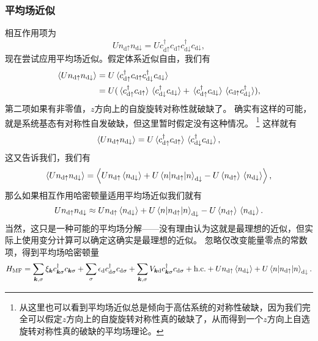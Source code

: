 \documentclass[hyperref, UTF8, a4paper]{ctexart}
\begin{document}
\subsubsection{平均场近似}

相互作用项为
\[
    U {n}_{\text{d} \uparrow} {n}_{\text{d} \downarrow} = U {c}_{\text{d} \uparrow}^\dagger {c}_{\text{d} \uparrow} {c}^\dagger_{\text{d} \downarrow} {c}_{\text{d} \downarrow},
\]
现在尝试应用平均场近似。假定体系近似自由，我们有
\[
    \begin{aligned}
        \expval{U {n}_{\text{d} \uparrow} {n}_{\text{d} \downarrow}} &= U \expval*{{c}_{\text{d} \uparrow}^\dagger {c}_{\text{d} \uparrow} {c}^\dagger_{\text{d} \downarrow} {c}_{\text{d} \downarrow}} \\
        &= U ( \expval*{{c}_{\text{d} \uparrow}^\dagger {c}_{\text{d} \uparrow}} \expval*{{c}_{\text{d} \downarrow}^\dagger {c}_{\text{d} \downarrow}} + \expval*{{c}_{\text{d} \uparrow}^\dagger {c}_{\text{d} \downarrow}} \expval*{{c}_{\text{d} \uparrow} {c}^\dagger_{\text{d} \downarrow}} ),
    \end{aligned}
\]
第二项如果有非零值，$z$方向上的自旋旋转对称性就破缺了。
确实有这样的可能，就是系统基态有对称性自发破缺，但这里暂时假定没有这种情况。%
\footnote{从这里也可以看到平均场近似总是倾向于高估系统的对称性破缺，因为我们完全可以假定$z$方向上的自旋旋转对称性真的破缺了，从而得到一个$z$方向上自选旋转对称性真的破缺的平均场理论。
}%
这样就有
\[
    \expval{U {n}_{\text{d} \uparrow} {n}_{\text{d} \downarrow}} = U \expval*{{c}_{\text{d} \uparrow}^\dagger {c}_{\text{d} \uparrow}} \expval*{{c}_{\text{d} \downarrow}^\dagger {c}_{\text{d} \downarrow}},
\]
这又告诉我们，我们有
\[
    \expval{U {n}_{\text{d} \uparrow} {n}_{\text{d} \downarrow}} = \expval{ U {n}_{\text{d} \uparrow} \expval*{{n}_{\text{d} \downarrow}} + U \expval*{{n}_{\text{d} \uparrow}} {n}_{\text{d} \downarrow} - U \expval*{{n}_{\text{d} \uparrow}} \expval*{{n}_{\text{d} \downarrow}} },
\]
那么如果相互作用哈密顿量适用平均场近似我们就有
\begin{equation}
    U {n}_{\text{d} \uparrow} {n}_{\text{d} \downarrow} \approx U {n}_{\text{d} \uparrow} \expval*{{n}_{\text{d} \downarrow}} + U \expval*{{n}_{\text{d} \uparrow}} {n}_{\text{d} \downarrow} - U \expval*{{n}_{\text{d} \uparrow}} \expval*{{n}_{\text{d} \downarrow}}.
\end{equation}
当然，这只是一种可能的平均场分解——没有理由认为这就是最理想的近似，但实际上使用变分计算可以确定这确实是最理想的近似。
忽略仅改变能量零点的常数项，得到平均场哈密顿量
\begin{equation}
    {H}_\text{MF} = \sum_{\vb*{k}, \sigma} \xi_{\vb*{k}} {c}_{\vb*{k}\sigma}^\dagger {c}_{\vb*{k} \sigma} + \sum_\sigma \epsilon_\text{d} {c}_{\text{d}\sigma}^\dagger {c}_{\text{d} \sigma} + \sum_{\vb*{k}, \sigma} V_{\vb*{k} \text{d}} {c}_{\vb*{k} \sigma}^\dagger {c}_{\text{d} \sigma} + \text{h.c.} + U {n}_{\text{d} \uparrow} \expval*{{n}_{\text{d} \downarrow}} + U \expval*{{n}_{\text{d} \uparrow}} {n}_{\text{d} \downarrow}.
    \label{eq:anderson-mf}
\end{equation}
\end{document}

